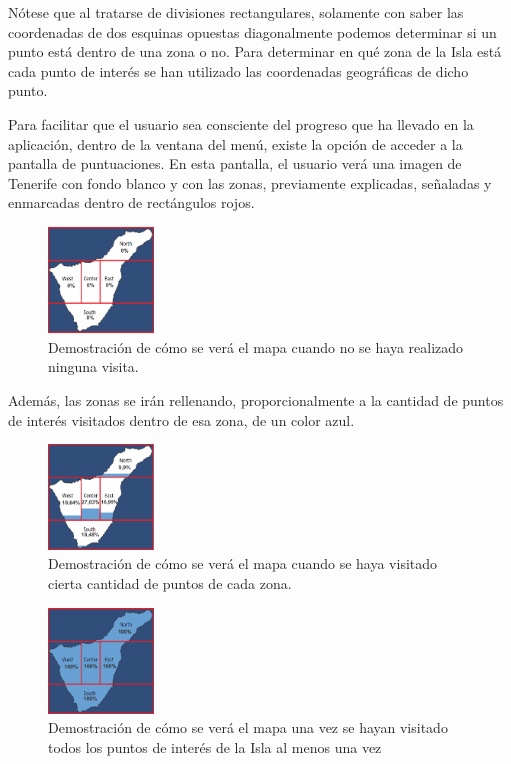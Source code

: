 Nótese que al tratarse de divisiones rectangulares, solamente con saber las coordenadas de dos esquinas opuestas diagonalmente podemos determinar si un punto está dentro de una zona o no. Para determinar en qué zona de la Isla está cada punto de interés se han utilizado las coordenadas geográficas de dicho punto.

Para facilitar que el usuario sea consciente del progreso que ha llevado en la aplicación, dentro de la ventana del menú, existe la opción de acceder a la pantalla de puntuaciones. En esta pantalla, el usuario verá una imagen de Tenerife con fondo blanco y con las zonas, previamente explicadas, señaladas y enmarcadas dentro de rectángulos rojos.

\begin{figure}[H]
    \centering
    \includegraphics[width=0.25\textwidth]{Memoria_TFG_LaTeX/images/mapaNoCompleto.png}
    \caption{Demostración de cómo se verá el mapa cuando no se haya realizado ninguna visita.}
    \label{fig:mapaNoCompleto}
\end{figure}

Además, las zonas se irán rellenando, proporcionalmente a la cantidad de puntos de interés visitados dentro de esa zona, de un color azul.

\begin{figure}[H]
    \centering
    \includegraphics[width=0.25\textwidth]{Memoria_TFG_LaTeX/images/mapaParcial.png}
    \caption{Demostración de cómo se verá el mapa cuando se haya visitado cierta cantidad de puntos de cada zona.}
    \label{fig:mapaParcial}
\end{figure}

\begin{figure}[H]
    \centering
    \includegraphics[width=0.25\textwidth]{Memoria_TFG_LaTeX/images/mapaCompleto.png}
    \caption{Demostración de cómo se verá el mapa una vez se hayan visitado todos los puntos de interés de la Isla al menos una vez}
    \label{fig:mapaCompleto}
\end{figure}


